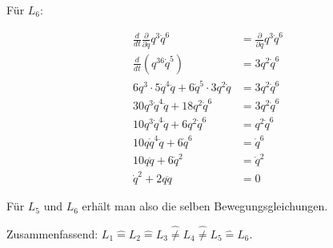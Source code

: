 \documentclass[a4paper,german,12pt,smallheadings]{scrartcl}
\begin{document}
Für $L_6$:

\begin{align*}
  \frac{d}{dt} \frac{\partial}{\partial \dot{q}} q^3\dot{q}^6 &= \frac{\partial}{\partial q} q^3\dot{q}^6 \\
  \frac{d}{dt} (q^36\dot{q}^5) &= 3q^2\dot{q}^6 \\
  6q^3 \cdot 5\dot{q}^4\ddot{q} + 6\dot{q}^5\cdot3q^2\dot{q} &= 3q^2\dot{q}^6 \\
  30q^3\dot{q}^4\ddot{q} + 18q^2\dot{q}^6 &= 3q^2\dot{q}^6 \\
  10q^3\dot{q}^4\ddot{q} + 6q^2\dot{q}^6 &= q^2\dot{q}^6 \\
  10q\dot{q}^4\ddot{q} + 6\dot{q}^6 &= \dot{q}^6 \\
  10q\ddot{q} + 6\dot{q}^2 &= \dot{q}^2 \\
  \dot{q}^2 + 2q\ddot{q} &= 0
\end{align*}

Für $L_5$ und $L_6$ erhält man also die selben Bewegungsgleichungen.

Zusammenfassend: $L_1 \widehat{=} L_2 \widehat{=} L_3 \widehat{\neq} L_4 \widehat{\neq} L_5 \widehat{=} L_6$.
\end{document}
